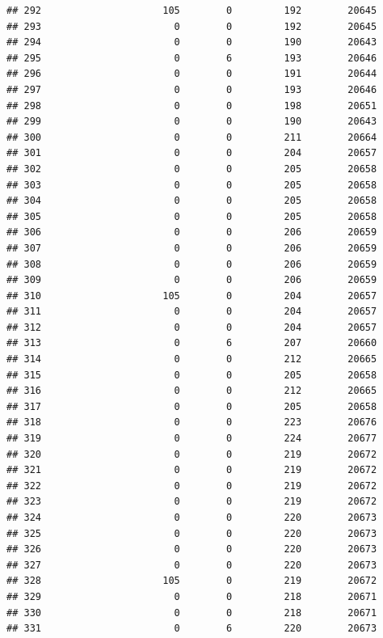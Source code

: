 \documentclass[
]{article}
\begin{document}
\begin{verbatim}
## 292                     105        0         192        20645
## 293                       0        0         192        20645
## 294                       0        0         190        20643
## 295                       0        6         193        20646
## 296                       0        0         191        20644
## 297                       0        0         193        20646
## 298                       0        0         198        20651
## 299                       0        0         190        20643
## 300                       0        0         211        20664
## 301                       0        0         204        20657
## 302                       0        0         205        20658
## 303                       0        0         205        20658
## 304                       0        0         205        20658
## 305                       0        0         205        20658
## 306                       0        0         206        20659
## 307                       0        0         206        20659
## 308                       0        0         206        20659
## 309                       0        0         206        20659
## 310                     105        0         204        20657
## 311                       0        0         204        20657
## 312                       0        0         204        20657
## 313                       0        6         207        20660
## 314                       0        0         212        20665
## 315                       0        0         205        20658
## 316                       0        0         212        20665
## 317                       0        0         205        20658
## 318                       0        0         223        20676
## 319                       0        0         224        20677
## 320                       0        0         219        20672
## 321                       0        0         219        20672
## 322                       0        0         219        20672
## 323                       0        0         219        20672
## 324                       0        0         220        20673
## 325                       0        0         220        20673
## 326                       0        0         220        20673
## 327                       0        0         220        20673
## 328                     105        0         219        20672
## 329                       0        0         218        20671
## 330                       0        0         218        20671
## 331                       0        6         220        20673

\end{verbatim}
\end{document}
